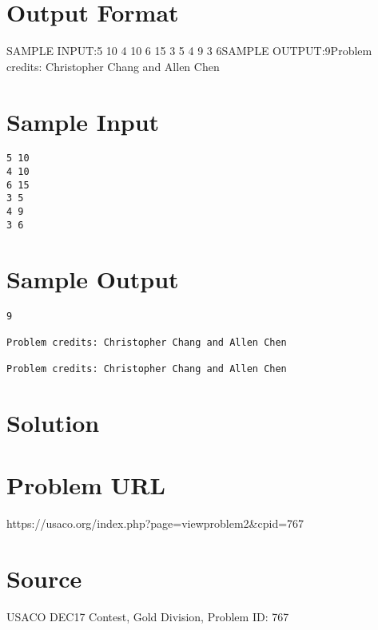 \documentclass[12pt]{article}
\begin{document}
\section*{Output Format}
SAMPLE INPUT:5 10
4 10
6 15
3 5
4 9
3 6SAMPLE OUTPUT:9Problem credits: Christopher Chang and Allen Chen

\section*{Sample Input}
\begin{verbatim}
5 10
4 10
6 15
3 5
4 9
3 6
\end{verbatim}

\section*{Sample Output}
\begin{verbatim}
9

Problem credits: Christopher Chang and Allen Chen

Problem credits: Christopher Chang and Allen Chen
\end{verbatim}

\section*{Solution}


\section*{Problem URL}
https://usaco.org/index.php?page=viewproblem2&cpid=767

\section*{Source}
USACO DEC17 Contest, Gold Division, Problem ID: 767
\end{document}
